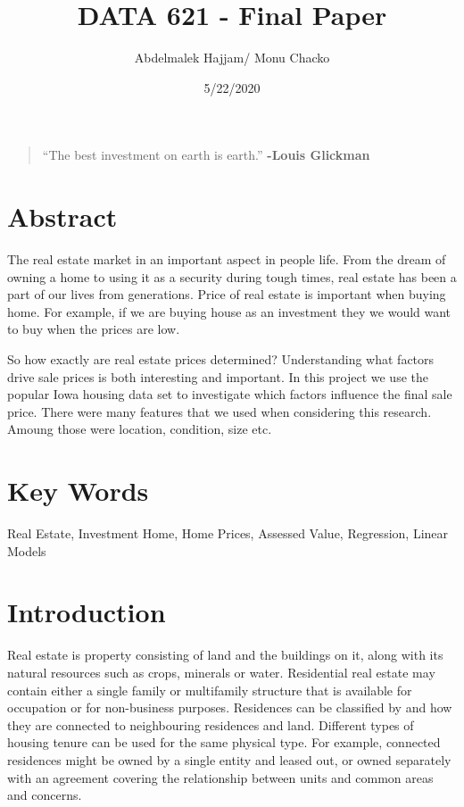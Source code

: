 \documentclass[
]{article}
\title{DATA 621 - Final Paper}
\author{Abdelmalek Hajjam/ Monu Chacko}
\date{5/22/2020}
\begin{document}
\maketitle

\begin{quote}
``The best investment on earth is earth.'' \textbf{-Louis Glickman}
\end{quote}

\hypertarget{abstract}{%
\section{Abstract}\label{abstract}}

The real estate market in an important aspect in people life. From the
dream of owning a home to using it as a security during tough times,
real estate has been a part of our lives from generations. Price of real
estate is important when buying home. For example, if we are buying
house as an investment they we would want to buy when the prices are
low.

So how exactly are real estate prices determined? Understanding what
factors drive sale prices is both interesting and important. In this
project we use the popular Iowa housing data set to investigate which
factors influence the final sale price. There were many features that we
used when considering this research. Amoung those were location,
condition, size etc.

\hypertarget{key-words}{%
\section{Key Words}\label{key-words}}

Real Estate, Investment Home, Home Prices, Assessed Value, Regression,
Linear Models

\hypertarget{introduction}{%
\section{Introduction}\label{introduction}}

Real estate is property consisting of land and the buildings on it,
along with its natural resources such as crops, minerals or water.
Residential real estate may contain either a single family or
multifamily structure that is available for occupation or for
non-business purposes. Residences can be classified by and how they are
connected to neighbouring residences and land. Different types of
housing tenure can be used for the same physical type. For example,
connected residences might be owned by a single entity and leased out,
or owned separately with an agreement covering the relationship between
units and common areas and concerns.
\end{document}
